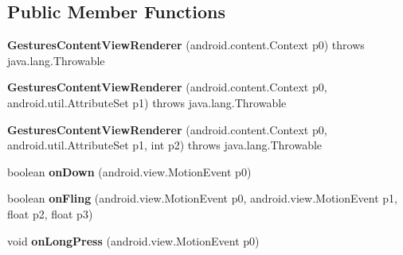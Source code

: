 \subsection*{Public Member Functions}
\begin{DoxyCompactItemize}
\item 
\hypertarget{classmd5aba1581820273abb5f52cfbdde47dc28_1_1GesturesContentViewRenderer_ae4012ec11bb2e0d2a891265b6e5b1bb1}{}{\bfseries Gestures\+Content\+View\+Renderer} (android.\+content.\+Context p0)  throws java.\+lang.\+Throwable 	\label{classmd5aba1581820273abb5f52cfbdde47dc28_1_1GesturesContentViewRenderer_ae4012ec11bb2e0d2a891265b6e5b1bb1}

\item 
\hypertarget{classmd5aba1581820273abb5f52cfbdde47dc28_1_1GesturesContentViewRenderer_a5921188705244465660b7fc3f45d966e}{}{\bfseries Gestures\+Content\+View\+Renderer} (android.\+content.\+Context p0, android.\+util.\+Attribute\+Set p1)  throws java.\+lang.\+Throwable 	\label{classmd5aba1581820273abb5f52cfbdde47dc28_1_1GesturesContentViewRenderer_a5921188705244465660b7fc3f45d966e}

\item 
\hypertarget{classmd5aba1581820273abb5f52cfbdde47dc28_1_1GesturesContentViewRenderer_af53ad76a5599163174c9d6b4c803bc05}{}{\bfseries Gestures\+Content\+View\+Renderer} (android.\+content.\+Context p0, android.\+util.\+Attribute\+Set p1, int p2)  throws java.\+lang.\+Throwable 	\label{classmd5aba1581820273abb5f52cfbdde47dc28_1_1GesturesContentViewRenderer_af53ad76a5599163174c9d6b4c803bc05}

\item 
\hypertarget{classmd5aba1581820273abb5f52cfbdde47dc28_1_1GesturesContentViewRenderer_a2343b2fc298174f620f9ecaab3333642}{}boolean {\bfseries on\+Down} (android.\+view.\+Motion\+Event p0)\label{classmd5aba1581820273abb5f52cfbdde47dc28_1_1GesturesContentViewRenderer_a2343b2fc298174f620f9ecaab3333642}

\item 
\hypertarget{classmd5aba1581820273abb5f52cfbdde47dc28_1_1GesturesContentViewRenderer_a2c76f7e821362220ae012c4afcdf5939}{}boolean {\bfseries on\+Fling} (android.\+view.\+Motion\+Event p0, android.\+view.\+Motion\+Event p1, float p2, float p3)\label{classmd5aba1581820273abb5f52cfbdde47dc28_1_1GesturesContentViewRenderer_a2c76f7e821362220ae012c4afcdf5939}

\item 
\hypertarget{classmd5aba1581820273abb5f52cfbdde47dc28_1_1GesturesContentViewRenderer_a8bb26e63bd7210e921e71d16f7c6acc8}{}void {\bfseries on\+Long\+Press} (android.\+view.\+Motion\+Event p0)\label{classmd5aba1581820273abb5f52cfbdde47dc28_1_1GesturesContentViewRenderer_a8bb26e63bd7210e921e71d16f7c6acc8}


\end{DoxyCompactItemize}
